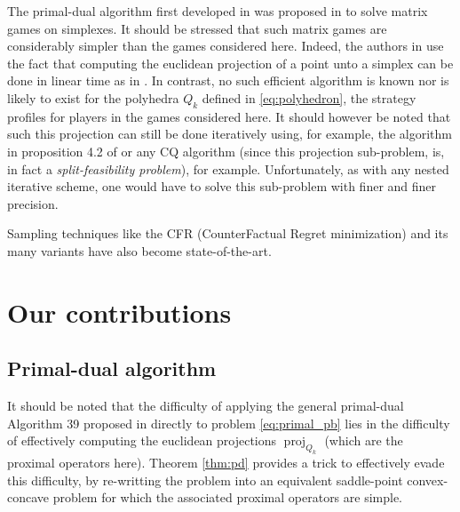 \documentclass{article} %
\DeclareMathOperator{\proj}{proj}
\begin{document}

The primal-dual algorithm first developed in \cite{chambolle2010} was
proposed \cite{chambolle2014ergodic} in to solve matrix games on
simplexes. It should be stressed that such matrix games are
considerably simpler than the games considered here. Indeed, the
authors in \cite{chambolle2014ergodic} use the fact that computing the
euclidean projection of a point unto a simplex can be done in linear
time as in \cite{duchi2008efficient}. In contrast, no such efficient
algorithm is known nor is likely to exist for the polyhedra $Q_k$
defined in \eqref{eq:polyhedron}, the strategy profiles for players in
the games considered here. It should however be noted that such this
projection can still be done iteratively using, for example, the
algorithm in proposition 4.2 of \cite{combettes2010dualization} or any
CQ algorithm (since this projection sub-problem, is, in fact a
\textit{split-feasibility problem}), for example. Unfortunately, as
with any nested iterative scheme, one would have to solve this
sub-problem with finer and finer precision.


Sampling techniques like the CFR (CounterFactual Regret minimization)
and its many variants
\cite{MartinZinkevichNIPS2007,lanctot2009monte,Bowling09012015} have
also become state-of-the-art.


\section{Our contributions}
\label{sec:algo}
\subsection{Primal-dual algorithm}
It should be noted that the difficulty of applying the general
primal-dual Algorithm 39 proposed in \cite{chambolle2010} directly to
problem \eqref{eq:primal_pb} lies in the difficulty of effectively
computing the euclidean projections $\proj_{Q_k}$ (which are the
proximal operators here). Theorem \ref{thm:pd} provides a trick to
effectively evade this difficulty, by re-writting the problem into an
equivalent saddle-point convex-concave problem for which the
associated proximal operators are simple.
\end{document}
